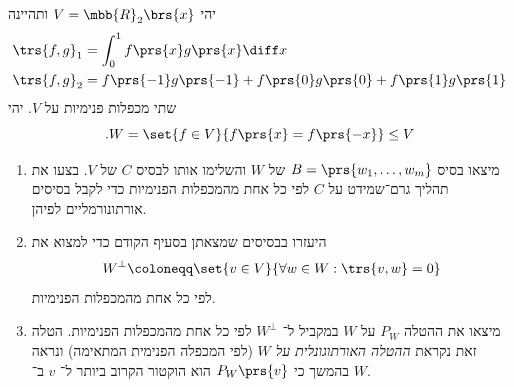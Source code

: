 \documentclass[a4paper,10pt,twoside,openany]{article}
\begin{document}
\begin{exercise}
יהי
$V = \mbb{R}_2\brs{x}$
ותהיינה
\begin{align*}
\trs{f,g}_1 &= \int_0^1 f\prs{x} g\prs{x} \diff x \\
\trs{f,g}_2 &= f\prs{-1} g\prs{-1} + f\prs{0} g\prs{0} + f\prs{1} g\prs{1}
\end{align*}
שתי מכפלות פנימיות על
$V$.
יהי
\[\text{.} W = \set{f \in V}{f\prs{x} = f\prs{-x}} \leq V\]
\begin{enumerate}
\item 
מיצאו בסיס
$B = \prs{w_1, \ldots, w_m}$
של
$W$
והשלימו אותו לבסיס
$C$
של
$V$.
בצעו את תהליך גרם־שמידט על
$C$
לפי כל אחת מהמכפלות הפנימיות כדי לקבל בסיסים אורתונורמליים לפיהן.

\item
היעזרו בבסיסים שמצאתן בסעיף הקודם כדי למצוא
את
\[W^\perp \coloneqq \set{v \in V}{\forall w \in W: \trs{v,w} = 0}\]
לפי כל אחת מהמכפלות הפנימיות.

\item
מיצאו את ההטלה
$P_W$
על
$W$
במקביל ל־%
$W^\perp$
לפי כל אחת מהמכפלות הפנימיות.
הטלה זאת נקראת
\emph{ההטלה האורתוגונלית על
$W$}
(לפי המכפלה הפנימית המתאימה) ונראה בהמשך כי
$P_W\prs{v}$
הוא הוקטור הקרוב ביותר ל־%
$v$
ב־%
$W$.
\end{enumerate}
\end{exercise}
\end{document}
